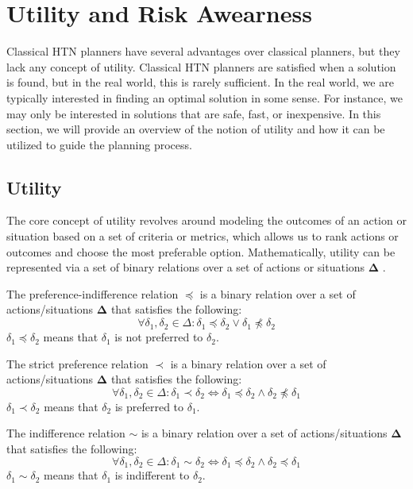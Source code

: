 \section{Utility and Risk Awearness}
\label{sec:utilityAnRisk}

Classical HTN planners have several advantages over classical planners, but they lack any concept of utility. Classical HTN planners are satisfied when a solution is found, but in the real world, this is rarely sufficient. In the real world, we are typically interested in finding an optimal solution in some sense. For instance, we may only be interested in solutions that are safe, fast, or inexpensive. In this section, we will provide an overview of the notion of utility and how it can be utilized to guide the planning process.

\subsection{Utility}
The core concept of utility revolves around modeling the outcomes of an action or situation based on a set of criteria or metrics, which allows us to rank actions or outcomes and choose the most preferable option. Mathematically, utility can be represented via a set of binary relations over a set of actions or situations $\mathbf{\Delta}$ \cite{fishburn1968utility}.

\begin{Tdef}
    The preference-indifference relation $\preceq$ is a binary relation over a set of actions/situations $\mathbf{\Delta}$ that satisfies the following:
    $$\forall \delta_1, \delta_2 \in \Delta : \delta_1 \preceq \delta_2 \vee \delta_1 \npreceq \delta_2$$
    $\delta_1 \preceq \delta_2$ means that $\delta_1$ is not preferred to $\delta_2$.
\end{Tdef}

\begin{Tdef}
    The strict preference relation $\prec$ is a binary relation over a set of actions/situations $\mathbf{\Delta}$ that satisfies the following:
    $$\forall \delta_1, \delta_2 \in \Delta : \delta_1 \prec \delta_2 \Longleftrightarrow \delta_1 \preceq \delta_2 \wedge \delta_2 \npreceq \delta_1$$
    $\delta_1 \prec \delta_2$ means that $\delta_2$ is preferred to $\delta_1$.
\end{Tdef}


\begin{Tdef}
    The indifference relation $\sim$ is a binary relation over a set of actions/situations $\mathbf{\Delta}$ that satisfies the following:
    $$\forall \delta_1, \delta_2 \in \Delta : \delta_1 \sim \delta_2 \Longleftrightarrow \delta_1 \preceq \delta_2 \wedge \delta_2 \preceq \delta_1$$
    $\delta_1 \sim \delta_2$ means that $\delta_1$ is indifferent to $\delta_2$.
\end{Tdef}


